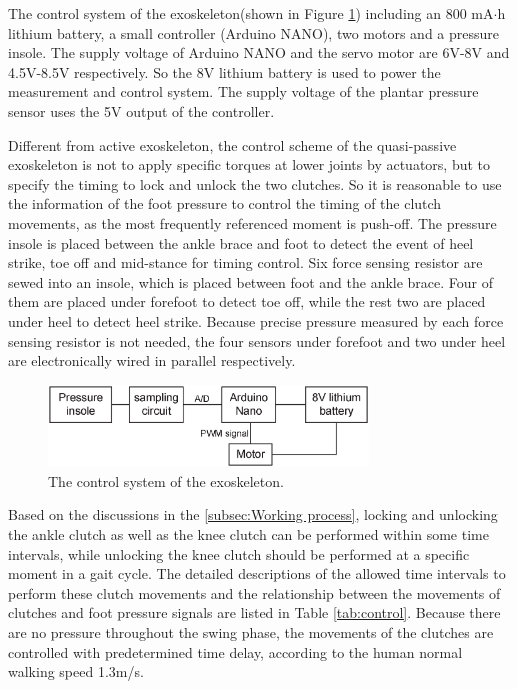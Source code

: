\documentclass[twocolumn,cleanfoot,10pt]{asme2ej}
\begin{document}
The control system of the exoskeleton(shown in Figure \ref{fig:control}) including an 800 mA$\cdot$h lithium battery, a small controller (Arduino NANO), two motors and a pressure insole. The supply voltage of Arduino NANO and the servo motor are 6V-8V and 4.5V-8.5V respectively. So the 8V lithium battery is used to power the measurement and control system. The supply voltage of the plantar pressure sensor uses the 5V output of the controller. 

Different from active exoskeleton, the control scheme of the quasi-passive exoskeleton is not to apply specific torques at lower joints by actuators, but to specify the timing to lock and unlock the two clutches. So it is reasonable to use the information of the foot pressure to control the timing of the clutch movements, as the most frequently referenced moment is push-off. The pressure insole is placed between the ankle brace and foot to detect the event of heel strike, toe off and mid-stance for timing control. Six force sensing resistor are sewed into an insole, which is placed between foot and the ankle brace. Four of them are placed under forefoot to detect toe off, while the rest two are placed under heel to detect heel strike. Because precise pressure measured by each force sensing resistor is not needed, the four sensors under forefoot and two under heel are electronically wired in parallel respectively. 

\begin{figure}[t]
	\centering
	\includegraphics[width=8.5cm]{control.eps}
	\caption{The control system of the exoskeleton.}
	\label{fig:control}   
\end{figure}

Based on the discussions in the \ref{subsec:Working process}, locking and unlocking the ankle clutch as well as the knee clutch can be performed within some time intervals, while unlocking the knee clutch should be performed at a specific moment in a gait cycle. The detailed descriptions of the allowed time intervals to perform these clutch movements and the relationship between the movements of clutches and foot pressure signals are listed in Table \ref{tab:control}. Because there are no pressure throughout the swing phase, the movements of the clutches are controlled with predetermined time delay, according to the human normal walking speed 1.3m/s.
\end{document}
